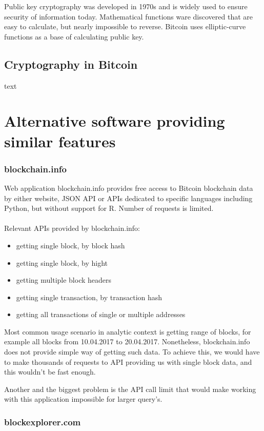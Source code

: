 \documentclass[12pt, en, eng, oneside]{mgr}
\begin{document}
Public key cryptography was developed in 1970s and is widely used to ensure security of information today. Mathematical functions ware discovered that are easy to calculate, but nearly impossible to reverse. Bitcoin uses elliptic-curve functions as a base of calculating public key.\cite{bartek}

\section{Cryptography in Bitcoin} 
text

\chapter{Alternative software providing similar features}
\subsection*{blockchain.info}

Web application blockchain.info provides free access to Bitcoin blockchain data by either website, JSON API or APIs dedicated to specific languages including Python, but without support for R. Number of requests is limited.
\\
\\
Relevant APIs provided by blockchain.info:
\begin{itemize}
\item
getting single block, by block hash
\item
getting single block, by hight
\item
getting multiple block headers
\item
getting single transaction, by transaction hash
\item
getting all transactions of single or multiple addresses


\end{itemize}

Most common usage scenario in analytic context is getting range of blocks, for example all blocks from 10.04.2017 to 20.04.2017. Nonetheless, blockchain.info does not provide simple way of getting such data. To achieve this, we would have to make thousands of requests to API providing us with single block data, and this wouldn't be fast enough.

Another and the biggest problem is the API call limit that would make working with this application impossible for larger query's.

\subsection*{blockexplorer.com}
\end{document}
